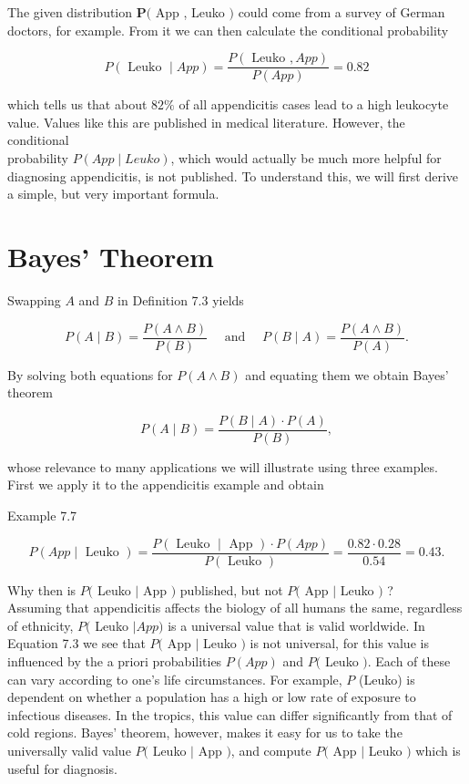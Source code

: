 \documentclass[10pt]{article}
\begin{document}
The given distribution $\boldsymbol{P}($ App , Leuko $)$ could come from a survey of German doctors, for example. From it we can then calculate the conditional probability

$$
P(\text { Leuko } \mid A p p)=\frac{P(\text { Leuko }, A p p)}{P(A p p)}=0.82
$$

which tells us that about $82 \%$ of all appendicitis cases lead to a high leukocyte value. Values like this are published in medical literature. However, the conditional\\
probability $P(A p p \mid L e u k o)$, which would actually be much more helpful for diagnosing appendicitis, is not published. To understand this, we will first derive a simple, but very important formula.

\section*{Bayes' Theorem}
Swapping $A$ and $B$ in Definition 7.3 yields

$$
P(A \mid B)=\frac{P(A \wedge B)}{P(B)} \quad \text { and } \quad P(B \mid A)=\frac{P(A \wedge B)}{P(A)} .
$$

By solving both equations for $P(A \wedge B)$ and equating them we obtain Bayes' theorem


\begin{equation*}
P(A \mid B)=\frac{P(B \mid A) \cdot P(A)}{P(B)}, \tag{7.2}
\end{equation*}


whose relevance to many applications we will illustrate using three examples. First we apply it to the appendicitis example and obtain

Example 7.7


\begin{equation*}
P(A p p \mid \text { Leuko })=\frac{P(\text { Leuko } \mid \text { App }) \cdot P(A p p)}{P(\text { Leuko })}=\frac{0.82 \cdot 0.28}{0.54}=0.43 . \tag{7.3}
\end{equation*}


Why then is $P($ Leuko $\mid$ App $)$ published, but not $P($ App $\mid$ Leuko $)$ ?\\
Assuming that appendicitis affects the biology of all humans the same, regardless of ethnicity, $P($ Leuko $\mid A p p)$ is a universal value that is valid worldwide. In Equation 7.3 we see that $P($ App $\mid$ Leuko $)$ is not universal, for this value is influenced by the a priori probabilities $P(A p p)$ and $P($ Leuko $)$. Each of these can vary according to one's life circumstances. For example, $P$ (Leuko) is dependent on whether a population has a high or low rate of exposure to infectious diseases. In the tropics, this value can differ significantly from that of cold regions. Bayes' theorem, however, makes it easy for us to take the universally valid value $P($ Leuko $\mid$ App $)$, and compute $P($ App $\mid$ Leuko $)$ which is useful for diagnosis.
\end{document}
